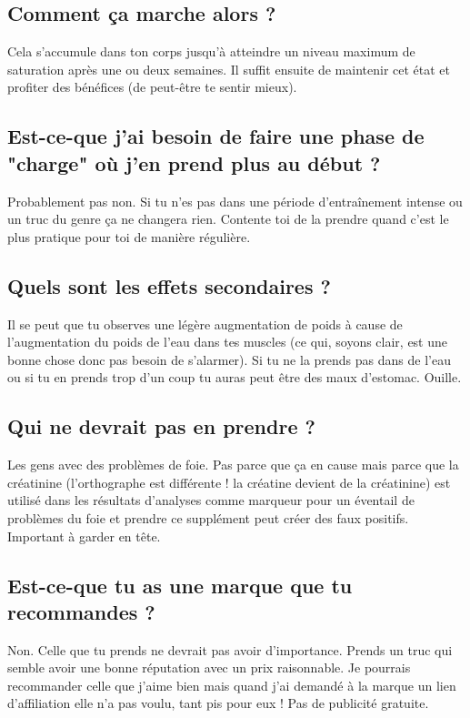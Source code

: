 \documentclass{article}
\begin{document}
\subsection{Comment ça marche alors ?}

Cela s'accumule dans ton corps jusqu'à atteindre un niveau maximum de saturation après une ou deux semaines. Il suffit ensuite de maintenir cet état et profiter des bénéfices (de peut-être te sentir mieux).

\subsection{Est-ce-que j'ai besoin de faire une phase de "charge" où j'en prend plus au début ?}

Probablement pas non. Si tu n'es pas dans une période d'entraînement intense ou un truc du genre ça ne changera rien. Contente toi de la prendre quand c'est le plus pratique pour toi de manière régulière.

\subsection{Quels sont les effets secondaires ?}

Il se peut que tu observes une légère augmentation de poids à cause de l'augmentation du poids de l'eau dans tes muscles (ce qui, soyons clair, est une bonne chose donc pas besoin de s'alarmer). Si tu ne la prends pas dans de l'eau ou si tu en prends trop d'un coup tu auras peut être des maux d'estomac. Ouille.

\subsection{Qui ne devrait pas en prendre ?}

Les gens avec des problèmes de foie. Pas parce que ça en cause mais parce que la créatinine (l'orthographe est différente ! la créatine devient de la créatinine) est utilisé dans les résultats d'analyses comme marqueur pour un éventail de problèmes du foie et prendre ce supplément peut créer des faux positifs. Important à garder en tête.

\subsection{Est-ce-que tu as une marque que tu recommandes ?}

Non. Celle que tu prends ne devrait pas avoir d'importance. Prends un truc qui semble avoir une bonne réputation avec un prix raisonnable. Je pourrais recommander celle que j'aime bien mais quand j'ai demandé à la marque un lien d'affiliation elle n'a pas voulu, tant pis pour eux ! Pas de publicité gratuite.
\end{document}
